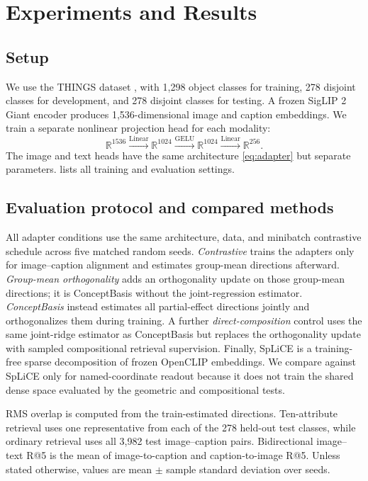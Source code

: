 \documentclass[mlmain,onecolumn]{jmlr}
\begin{document}
\section{Experiments and Results}

\subsection{Setup}
\label{sec:setup}

We use the THINGS dataset \citep{hebart2019things}, with 1,298 object classes for training, 278 disjoint classes for development, and 278 disjoint classes for testing. A frozen SigLIP 2 Giant encoder \citep{tschannen2025siglip2} produces 1,536-dimensional image and caption embeddings. We train a separate nonlinear projection head for each modality:
\begin{equation}
  \mathbb{R}^{1536}
  \xrightarrow{\mathrm{Linear}}
  \mathbb{R}^{1024}
  \xrightarrow{\mathrm{GELU}}
  \mathbb{R}^{1024}
  \xrightarrow{\mathrm{Linear}}
  \mathbb{R}^{256}.
  \label{eq:adapter}
\end{equation}
The image and text heads have the same architecture \eqref{eq:adapter} but separate parameters.  lists all training and evaluation settings.

\subsection{Evaluation protocol and compared methods}

All adapter conditions use the same architecture, data, and minibatch contrastive schedule across five matched random seeds. \emph{Contrastive} trains the adapters only for image--caption alignment and estimates group-mean directions afterward. \emph{Group-mean orthogonality} adds an orthogonality update on those group-mean directions; it is ConceptBasis without the joint-regression estimator. \emph{ConceptBasis} instead estimates all partial-effect directions jointly and orthogonalizes them during training. A further \emph{direct-composition} control uses the same joint-ridge estimator as ConceptBasis but replaces the orthogonality update with sampled compositional retrieval supervision. Finally, SpLiCE is a training-free sparse decomposition of frozen OpenCLIP embeddings. We compare against SpLiCE only for named-coordinate readout because it does not train the shared dense space evaluated by the geometric and compositional tests.

RMS overlap is computed from the train-estimated directions. Ten-attribute retrieval uses one representative from each of the 278 held-out test classes, while ordinary retrieval uses all 3,982 test image--caption pairs. Bidirectional image--text R@5 is the mean of image-to-caption and caption-to-image R@5. Unless stated otherwise, values are mean $\pm$ sample standard deviation over seeds.
\end{document}
